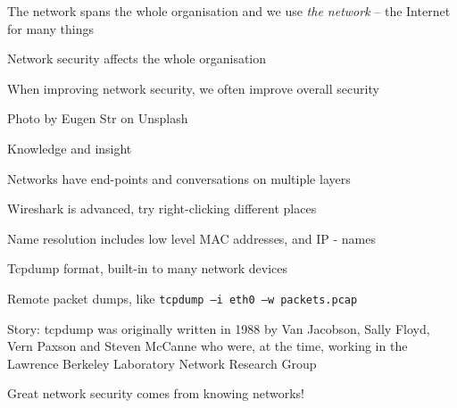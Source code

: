 \documentclass[Screen16to9,17pt]{foils}
\begin{document}
\begin{list2}
\item The network spans the whole organisation and we use \emph{the network} -- the Internet for many things
\item Network security affects the whole organisation
\item When improving network security, we often improve overall security
\end{list2}




\hfill Photo by Eugen Str on Unsplash



{\Large Knowledge and insight}
\begin{list2}
\item Networks have end-points and conversations on multiple layers
\item Wireshark is advanced, try right-clicking different places
\item Name resolution includes low level MAC addresses, and IP - names
\end{list2}

\begin{list2}
\item Tcpdump format, built-in to many network devices
\item Remote packet dumps, like \verb+tcpdump –i eth0 –w packets.pcap+
\item Story: tcpdump was originally written in 1988 by Van Jacobson, Sally Floyd, Vern Paxson and Steven McCanne who were, at the time, working in the Lawrence Berkeley Laboratory Network Research Group\\
\end{list2}

\vskip 5mm

\centerline{\Large Great network security comes from knowing networks!}

\end{document}
